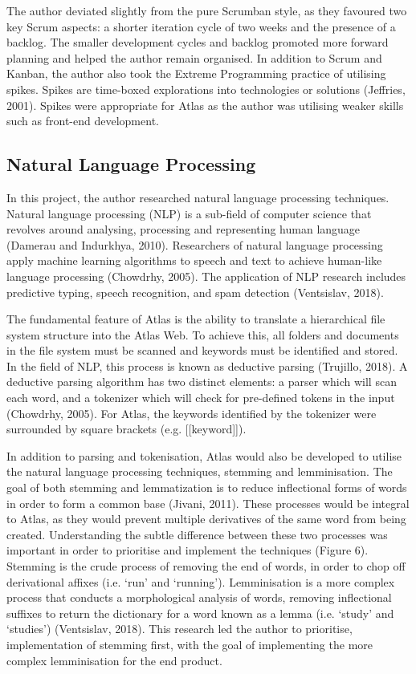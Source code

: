\documentclass{article}
\begin{document}
The author deviated slightly from the pure Scrumban style, as they favoured two key Scrum aspects: a shorter iteration cycle of two weeks and the presence of a backlog. The smaller development cycles and backlog promoted more forward planning and helped the author remain organised. In addition to Scrum and Kanban, the author also took the Extreme Programming practice of utilising spikes. Spikes are time-boxed explorations into technologies or solutions (Jeffries, 2001). Spikes were appropriate for Atlas as the author was utilising weaker skills such as front-end development.

\subsection{Natural Language Processing}

In this project, the author researched natural language processing techniques. Natural language processing (NLP) is a sub-field of computer science that revolves around analysing, processing and representing human language (Damerau and Indurkhya, 2010). Researchers of natural language processing apply machine learning algorithms to speech and text to achieve human-like language processing (Chowdrhy, 2005). The application of NLP research includes predictive typing, speech recognition, and spam detection (Ventsislav, 2018).

The fundamental feature of Atlas is the ability to translate a hierarchical file system structure into the Atlas Web. To achieve this, all folders and documents in the file system must be scanned and keywords must be identified and stored. In the field of NLP, this process is known as deductive parsing (Trujillo, 2018). A deductive parsing algorithm has two distinct elements: a parser which will scan each word, and a tokenizer which will check for pre-defined tokens in the input (Chowdrhy, 2005). For Atlas, the keywords identified by the tokenizer were surrounded by square brackets (e.g. [[keyword]]).

In addition to parsing and tokenisation, Atlas would also be developed to utilise the natural language processing techniques, stemming and lemminisation. The goal of both stemming and lemmatization is to reduce inflectional forms of words in order to form a common base (Jivani, 2011). These processes would be integral to Atlas, as they would prevent multiple derivatives of the same word from being created. Understanding the subtle difference between these two processes was important in order to prioritise and implement the techniques (Figure 6). Stemming is the crude process of removing the end of words, in order to chop off derivational affixes (i.e. ‘run’ and ‘running’). Lemminisation is a more complex process that conducts a morphological analysis of words, removing inflectional suffixes to return the dictionary for a word known as a lemma (i.e. ‘study’ and ‘studies’) (Ventsislav, 2018). This research led the author to prioritise, implementation of stemming first, with the goal of implementing the more complex lemminisation for the end product.
\end{document}
